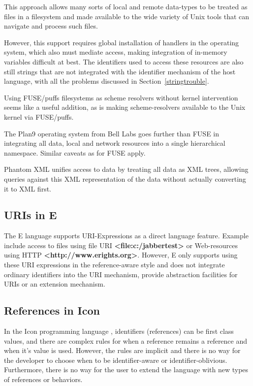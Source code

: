 \documentclass[preprint,authoryear]{acm_proc_article-sp}
\begin{document}
This approach allows many sorts of local and remote data-types to be 
treated as files in a filesystem and made available to the wide variety
of Unix tools that can navigate and process such files.  

However, this support requires global installation of handlers in the operating
system, which also must mediate access, making integration of in-memory 
variables difficult at best.  The identifiers used to access these resources
are also still strings that are not integrated with the identifier mechanism of
the host language, with all the problems discussed in Section~\ref{stringtrouble}.

Using FUSE/puffs filesystems as scheme resolvers without kernel intervention seems
like a useful addition, as is making scheme-resolvers available to the Unix kernel
via FUSE/puffs.

The Plan9\cite{plan9names}\cite{plan9network} operating system from Bell Labs goes further than FUSE in integrating
all data, local and network resources into a single hierarchical namespace.  Similar
caveats as for FUSE apply.

Phantom XML\cite{phantomxml} unifies access to data by treating all data as
XML trees, allowing queries against this XML representation of the data without
actually converting it to XML first.  




\subsection{URIs in E}

The E language\cite{MillerRobustComposition}  supports URI-Expressions as a
direct language feature.  Example include access to files
using file URI  {\bf <file:c:/jabbertest>} or Web-resources using HTTP {\bf <http://www.erights.org>}.  However,
E only supports using these URI expressions in the reference-aware style and does not integrate 
ordinary identifiers into the URI mechanism, provide abstraction facilities 
for URIs or an extension mechanism. 


\subsection{References in Icon}

In the Icon programming language \cite{IconRef} , identifiers (references) can be first class values,
and there are complex rules for when a reference remains a reference and when
it's value is used.  However, the rules are implicit and there is no way for the 
developer to choose when to be identifier-aware or identifier-oblivious.  Furthermore,
there is no way for the user to extend the language with new types of references 
or behaviors.
\end{document}
